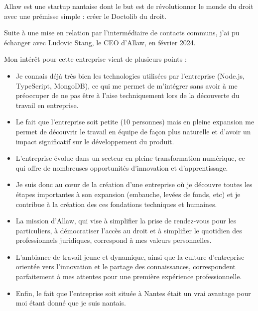 Allaw est une startup nantaise dont le but est de révolutionner le monde du droit
avec une prémisse simple : créer le Doctolib du droit.

Suite à une mise en relation par l'intermédiaire de contacts communs,
j'ai pu échanger avec Ludovic Stang, le CEO d'Allaw, en février 2024.

Mon intérêt pour cette entreprise vient de plusieurs points :
\begin{itemize}
  \item Je connais déjà très bien les technologies utilisées par l'entreprise
        (Node.js, TypeScript, MongoDB),
        ce qui me permet de m'intégrer sans avoir à me préoccuper de ne pas
        être à l'aise techniquement lors de la découverte du travail en entreprise.

  \item Le fait que l'entreprise soit petite (10 personnes) mais en pleine expansion
        me permet de découvrir le travail en équipe de façon plus naturelle et
        d'avoir un impact significatif sur le développement du produit.

  \item L'entreprise évolue dans un secteur en pleine transformation numérique,
        ce qui offre de nombreuses opportunités d'innovation et d'apprentissage.

  \item Je suis donc au cœur de la création d'une entreprise où je découvre toutes
        les étapes importantes à son expansion (embauche, levées de fonds, etc) et je contribue
        à la création des ces fondations techniques et humaines.

  \item La mission d'Allaw, qui vise à simplifier la prise de rendez-vous pour les
        particuliers, à démocratiser l'accès au droit et à simplifier le quotidien des
        professionnels juridiques, correspond à mes valeurs personnelles.

  \item L'ambiance de travail jeune et dynamique, ainsi que la culture d'entreprise
        orientée vers l'innovation et le partage des connaissances, correspondent
        parfaitement à mes attentes pour une première expérience professionnelle.

  \item Enfin, le fait que l'entreprise soit située à Nantes était un vrai
        avantage pour moi étant donné que je suis nantais.
\end{itemize}

